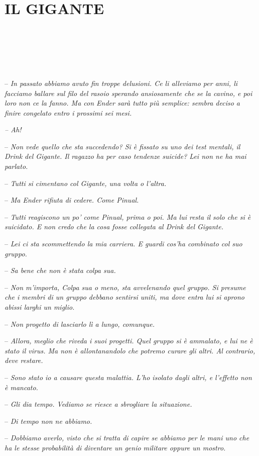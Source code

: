 \chapter{IL GIGANTE}

{~}

{~}

{~}

{-- \emph{In passato abbiamo avuto fin troppe delusioni. Ce li alleviamo
		per anni, li facciamo ballare sul filo del rasoio sperando ansiosamente
		che se la cavino, e poi loro non ce la fanno. Ma con Ender sarà tutto
		più semplice: sembra deciso a finire congelato entro i prossimi sei
		mesi.}}

\emph{{-- Ah!}}

{-- \emph{Non vede quello che sta succedendo? Si è fissato su uno dei
		test mentali, il Drink del Gigante. Il ragazzo ha per caso tendenze
		suicide? Lei non ne ha mai parlato.}}

{-- \emph{Tutti si cimentano col Gigante, una volta o l'altra.}}

{-- \emph{Ma Ender rifiuta di cedere. Come Pinual.}}

{-- \emph{Tutti reagiscono un po' come Pinual, prima o poi. Ma lui resta
		il solo che si è suicidato. E non credo che la cosa fosse collegata al
		Drink del Gigante.}}

{-- \emph{Lei ci sta scommettendo la mia carriera. E guardi cos'ha
		combinato col suo gruppo.}}

{-- \emph{Sa bene che non è stata colpa sua.}}

{-- \emph{Non m'importa, Colpa sua o meno, sta avvelenando quel gruppo.
		Si presume che i membri di un gruppo debbano sentirsi uniti, ma dove
		entra lui si aprono abissi larghi un miglio.}}

{-- \emph{Non progetto di lasciarlo lì a lungo, comunque.}}

{-- \emph{Allora, meglio che riveda i suoi progetti. Quel gruppo si è
		ammalato, e lui ne è stato il virus. Ma non è allontanandolo che potremo
		curare gli altri. Al contrario, deve restare.}}

{-- \emph{Sono stato io a causare questa malattia. L'ho isolato dagli
		altri, e l'effetto non è mancato.}}

{-- \emph{Gli dia tempo. Vediamo se riesce a sbrogliare la situazione.}}

{-- \emph{Di tempo non ne abbiamo.}}

{-- \emph{Dobbiamo averlo, visto che si tratta di capire se abbiamo per
		le mani uno che ha le stesse probabilità di diventare un genio militare
		oppure un mostro.}}

